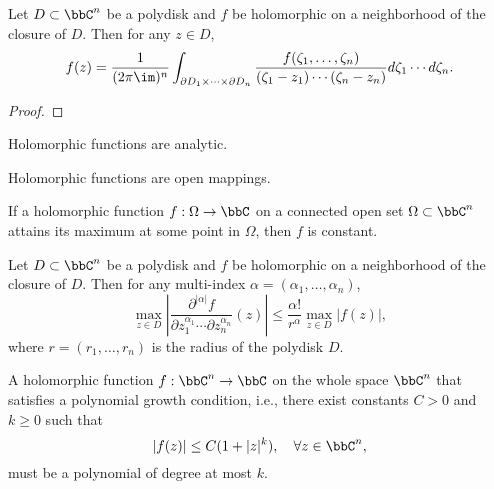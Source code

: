     \begin{theorem}\label{thm:Cauchy_Integral_Formula_in_several_complex_variables}
        Let \(D \subset \bbC^n\) be a polydisk and \(f\) be holomorphic on a neighborhood of the closure of \(D\). 
        Then for any \(z \in D\),
        \[ f(z) = \frac{1}{(2\pi \im)^n} \int_{\partial D_1 \times \cdots \times \partial D_n} \frac{f(\zeta_1, \ldots, \zeta_n)}{(\zeta_1 - z_1) \cdots (\zeta_n - z_n)} d\zeta_1 \cdots d\zeta_n. \]
    \end{theorem}
    \begin{proof}
    \end{proof}

    \begin{corollary}\label{cor:holomorphic_functions_are_analytic}
        Holomorphic functions are analytic.
    \end{corollary}

    \begin{proposition}\label{prop:open_mapping_theorem}
        Holomorphic functions are open mappings.
    \end{proposition}

    \begin{proposition}\label{prop:rigidity_of_holomorphic_functions}
        If a holomorphic function \(f: \Omega \to \bbC\) on a connected open set \(\Omega \subset \bbC^n\) attains its maximum at some point in \(\Omega\), then \(f\) is constant.
    \end{proposition}

    \begin{lemma}\label{prop:Cauchy_estimates}
        Let \(D \subset \bbC^n\) be a polydisk and \(f\) be holomorphic on a neighborhood of the closure of \(D\). Then for any multi-index \(\alpha = (\alpha_1, \ldots, \alpha_n)\),
        \[ \max_{z \in D} \left| \frac{\partial^{|\alpha|} f}{\partial z_1^{\alpha_1} \cdots \partial z_n^{\alpha_n}}(z) \right| \leq \frac{\alpha!}{r^\alpha} \max_{z \in D} |f(z)|, \]
        where \(r = (r_1, \ldots, r_n)\) is the radius of the polydisk \(D\).
    \end{lemma}

    \begin{theorem}\label{thm:generalized_Liouville_Theorem}
        A holomorphic function \(f: \bbC^n \to \bbC\) on the whole space \(\bbC^n\) that satisfies a polynomial growth condition, i.e., there exist constants \(C > 0\) and \(k \geq 0\) such that 
        \[ |f(z)| \leq C(1 + |z|^k), \quad \forall z \in \bbC^n, \]
        must be a polynomial of degree at most \(k\).
    \end{theorem}

